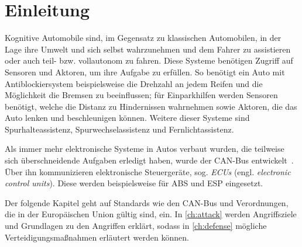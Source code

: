 
\chapter{Einleitung}
Kognitive Automobile sind, im Gegensatz zu klassischen Automobilen, in der Lage
ihre Umwelt und sich selbst wahrzunehmen und dem Fahrer zu assistieren oder
auch teil- bzw. vollautonom zu fahren. Diese Systeme benötigen Zugriff auf
Sensoren und Aktoren, um ihre Aufgabe zu erfüllen. So benötigt ein Auto mit
Antiblockiersystem beispielsweise die Drehzahl an jedem Reifen und die
Möglichkeit die Bremsen zu beeinflussen; für Einparkhilfen werden Sensoren
benötigt, welche die Distanz zu Hindernissen wahrnehmen sowie Aktoren, die das
Auto lenken und beschleunigen können. Weitere dieser Systeme sind
Spurhalteassistenz, Spurwechselassistenz und Fernlichtassistenz.

Als immer mehr elektronische Systeme in Autos verbaut wurden, die teilweise
sich überschneidende Aufgaben erledigt haben, wurde der CAN-Bus
entwickelt~\cite{Kiencke1986}. Über ihn kommunizieren elektronische
Steuergeräte, sog. \textit{ECUs} (engl. \textit{electronic control units}).
Diese werden beispielsweise für ABS und ESP eingesetzt.

Der folgende Kapitel geht auf Standards wie den CAN-Bus und Verordnungen, die
in der Europäischen Union gültig sind, ein. In \cref{ch:attack} werden
Angriffsziele und Grundlagen zu den Angriffen erklärt, sodass in
\cref{ch:defense} mögliche Verteidigungsmaßnahmen erläutert werden können.